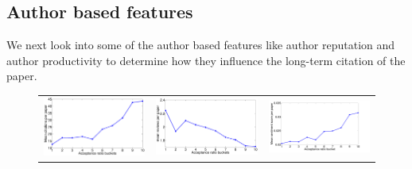 \subsection{Author based features}
\label{author_analysis}

We next look into some of the author based features like author reputation and author productivity to determine how they influence the long-term citation of the paper.  
\begin{figure}
\centering
\begin{tabular}{ccc}
\includegraphics[scale=0.135]{./texfiles/Chapter_4/jcdl/figures/citation_succes_ratio.eps} & \includegraphics[scale=0.135]{./texfiles/Chapter_4/jcdl/figures/review_succes_ratio.eps} & \includegraphics[scale=0.135]{./texfiles/Chapter_4/jcdl/figures/sentiment_succes_ratio-eps-converted-to.pdf}

\end{tabular}
\end{figure}
